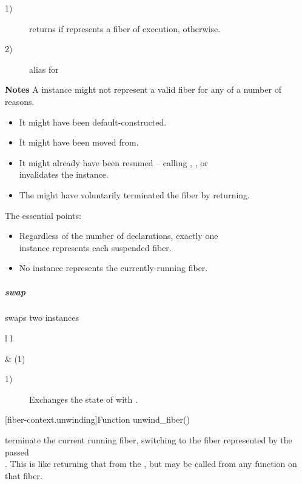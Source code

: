 \begin{description}
    \item[1)] returns  if  represents a fiber of
              execution,  otherwise.
    \item[2)] alias for 
\end{description}

{\bfseries Notes}
\newline
A \fiber instance might not represent a valid fiber for any of a number of reasons.
\begin{itemize}
    \item It might have been default-constructed.
    \item It might have been moved from.
    \item It might already have been resumed -- calling \resume, \resumewith,
          \xtresume or\\
          \xtresumewith invalidates the instance.
    \item The \entryfn\xspace might have voluntarily terminated the fiber by
          returning.
\end{itemize}
The essential points:
\begin{itemize}
    \item Regardless of the number of \fiber declarations, exactly one\\
          \fiber instance represents each suspended fiber.
    \item No \fiber instance represents the currently-running fiber.
\end{itemize}


\subparagraph*{swap}
swaps two \fiber instances\\

\begin{tabular}{ l l }
    \midrule

     & (1)\\

    \midrule
\end{tabular}

\begin{description}
    \item[1)] Exchanges the state of  with .\\
\end{description}


[fiber-context.unwinding]{Function unwind\_fiber()}

terminate the current running fiber, switching to the fiber represented by
the passed\\\fiber. This is like returning that \fiber from the \entryfn, but may
be called from any function on that fiber.\\

